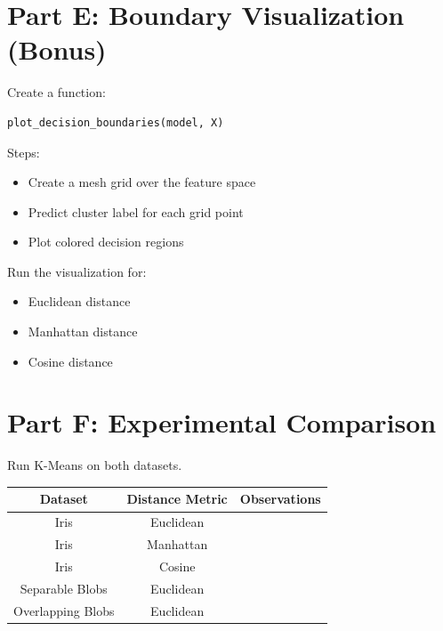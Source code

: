 \documentclass[12pt,a4paper]{article}
\begin{document}

\section{Part E: Boundary Visualization (Bonus)}

\begin{tcolorbox}

Create a function:

\begin{verbatim}
plot_decision_boundaries(model, X)
\end{verbatim}

Steps:

\begin{itemize}
\item Create a mesh grid over the feature space
\item Predict cluster label for each grid point
\item Plot colored decision regions
\end{itemize}

Run the visualization for:

\begin{itemize}
\item Euclidean distance
\item Manhattan distance
\item Cosine distance
\end{itemize}

\end{tcolorbox}


\section{Part F: Experimental Comparison}

Run K-Means on both datasets.

\begin{center}
\begin{tabular}{|c|c|c|}
\hline
Dataset & Distance Metric & Observations \\
\hline
Iris & Euclidean & \\
\hline
Iris & Manhattan & \\
\hline
Iris & Cosine & \\
\hline
Separable Blobs & Euclidean & \\
\hline
Overlapping Blobs & Euclidean & \\
\hline
\end{tabular}
\end{center}
\end{document}
